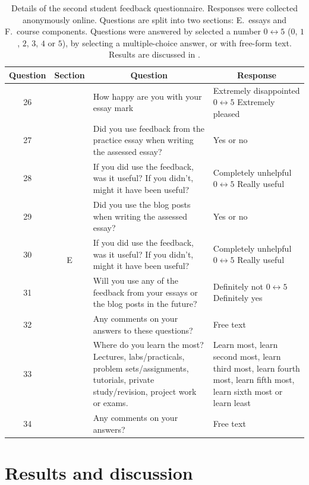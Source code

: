 \begin{table}\scriptsize
\centering
\begin{tabular}{c c p{2in} p{2in}}
\toprule
\multicolumn{1}{c}{Question} & \multicolumn{1}{c}{Section} & \multicolumn{1}{c}{Question} & \multicolumn{1}{c}{Response} \\
\midrule 
26 & \multirow{17}{*}{E} & How happy are you with your essay mark & Extremely disappointed $0 \leftrightarrow 5$ Extremely pleased \\
27 &		& Did you use feedback from the practice essay when writing the assessed essay? & Yes or no \\
28 & 	& If you did use the feedback, was it useful? If you didn't, might it have been useful? & Completely unhelpful $0 \leftrightarrow 5$ Really useful \\
29 &		& Did you use the blog posts when writing the assessed essay? & Yes or no \\
30 & 	& If you did use the feedback, was it useful? If you didn't, might it have been useful? & Completely unhelpful $0 \leftrightarrow 5$ Really useful \\
31 & 	& Will you use any of the feedback from your essays or the blog posts in the future? & Definitely not $0 \leftrightarrow 5$ Definitely yes \\
32 &		& Any comments on your answers to these questions? & Free text \\
\midrule
33 & \multirow{5}{*}{F} & Where do you learn the most? Lectures, labs/practicals, problem sets/assignments, tutorials, private study/revision, project work or exams. & Learn most, learn second most, learn third most, learn fourth most, learn fifth most, learn sixth most or learn least\\
34 &	& Any comments on your answers? & Free text \\
 \bottomrule
\end{tabular}
\caption{Details of the second student feedback questionnaire. Responses were collected anonymously online. Questions are split into two sections: E.\ essays and F.\ course components. Questions were answered by selected a number $0 \leftrightarrow 5$ ($0$, $1$, $2$, $3$, $4$ or $5$), by selecting a multiple-choice answer, or with free-form text. Results are discussed in .}\label{tab:form2}
\end{table}

\section{Results and discussion}\label{sec:results}

